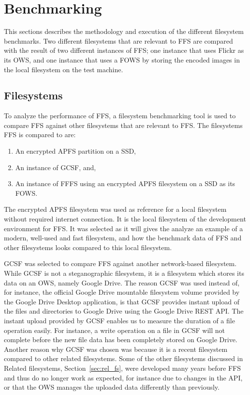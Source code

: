 \section{Benchmarking}
This sections describes the methodology and execution of the different filesystem benchmarks. Two different filesystems that are relevant to FFS are compared with the result of two different instances of FFS; one instance that uses Flickr as its OWS, and one instance that uses a FOWS by storing the encoded images in the local filesystem on the test machine.

\subsection{Filesystems}
To analyze the performance of FFS, a filesystem benchmarking tool is used to compare FFS against other filesystems that are relevant to FFS. The filesystems FFS is compared to are:
\begin{enumerate}
	\item An encrypted APFS partition on a SSD,
	\item An instance of GCSF, and,
	\item An instance of FFFS using an encrypted APFS filesystem on a SSD as its FOWS.
\end{enumerate}
The encrypted APFS filesystem was used as reference for a local filesystem without required internet connection. It is the local filesystem of the development environment for FFS. It was selected as it will gives the analyze an example of a modern, well-used and fast filesystem, and how the benchmark data of FFS and other filesystems looks compared to this local filesystem.

GCSF was selected to compare FFS against another network-based filesystem. While GCSF is not a steganographic filesystem, it is a filesystem which stores its data on an OWS, namely Google Drive. The reason GCSF was used instead of, for instance, the official Google Drive mountable filesystem volume provided by the Google Drive Desktop application, is that GCSF provides instant upload of the files and directories to Google Drive using the Google Drive REST API. The instant upload provided by GCSF enables us to measure the duration of a file operation easily. For instance, a write operation on a file in GCSF will not complete before the new file data has been completely stored on Google Drive. Another reason why GCSF was chosen was because it is a recent filesystem compared to other related filesystems. Some of the other filesystems discussed in Related filesystems, Section~\ref{sec:rel_fs}, were developed many years before FFS and thus do no longer work as expected, for instance due to changes in the API, or that the OWS manages the uploaded data differently than previously.

